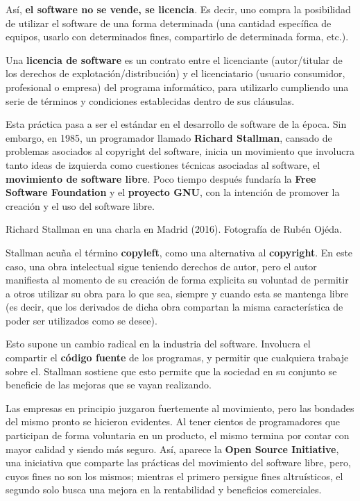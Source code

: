 Así, \textbf{el software no se vende, se licencia}. Es decir, uno compra la
posibilidad de utilizar el software de una forma determinada (una cantidad
específica de equipos, usarlo con determinados fines, compartirlo de determinada
forma, etc.).

\begin{definition}
    Una \textbf{licencia de software} es un contrato entre el licenciante
    (autor/titular de los derechos de explotación/distribución) y el licenciatario
    (usuario consumidor, profesional o empresa) del programa informático, para
    utilizarlo cumpliendo una serie de términos y condiciones establecidas dentro
    de sus cláusulas.
\end{definition}

Esta práctica pasa a ser el estándar en el desarrollo de software de la época.
Sin embargo, en 1985, un programador llamado \textbf{Richard Stallman}, cansado
de problemas asociados al copyright del software, inicia un movimiento que
involucra tanto ideas de izquierda como cuestiones técnicas asociadas al software,
el \textbf{movimiento de software libre}. Poco tiempo después fundaría la
\textbf{Free Software Foundation} y el \textbf{proyecto GNU}, con la intención
de promover la creación y el uso del software libre.\autocite{salus_2008}

{Richard Stallman en una charla en Madrid (2016).}
{Fotografía de Rubén Ojéda.}

Stallman acuña el término \textbf{copyleft}, como una alternativa al
\textbf{copyright}. En este caso, una obra intelectual sigue teniendo derechos
de autor, pero el autor manifiesta al momento de su creación de forma explicita
su voluntad de permitir a otros utilizar su obra para lo que sea, siempre y
cuando esta se mantenga libre (es decir, que los derivados de dicha obra
compartan la misma característica de poder ser utilizados como se desee).

Esto supone un cambio radical en la industria del software. Involucra el
compartir el \textbf{código fuente} de los programas, y permitir que cualquiera
trabaje sobre el. Stallman sostiene que esto permite que la sociedad en su
conjunto se beneficie de las mejoras que se vayan realizando.

Las empresas en principio juzgaron fuertemente al movimiento, pero las bondades
del mismo pronto se hicieron evidentes. Al tener cientos de programadores que
participan de forma voluntaria en un producto, el mismo termina por contar con mayor
calidad y siendo más seguro. Así, aparece la \textbf{Open Source Initiative},
una iniciativa que comparte las prácticas del movimiento del software libre,
pero, cuyos fines no son los mismos; mientras el primero persigue fines
altruísticos, el segundo solo busca una mejora en la rentabilidad y beneficios
comerciales.

